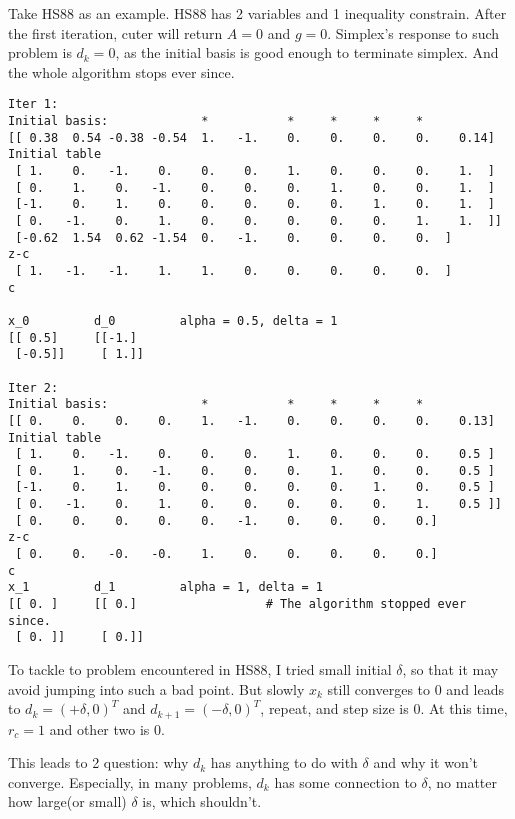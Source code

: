 \documentclass[10pt]{article}
\begin{document}
	Take HS88 as an example. HS88 has 2 variables and 1 inequality constrain. After the first iteration, cuter will return $A = 0$ and $g = 0$. Simplex's response to such problem is $d_k = 0$, as the initial basis is good enough to terminate simplex. And the whole algorithm stops ever since.
	\begin{lstlisting}
Iter 1:
Initial basis:             *           *     *     *     *
[[ 0.38  0.54 -0.38 -0.54  1.   -1.    0.    0.    0.    0.    0.14] 	Initial table
 [ 1.    0.   -1.    0.    0.    0.    1.    0.    0.    0.    1.  ]
 [ 0.    1.    0.   -1.    0.    0.    0.    1.    0.    0.    1.  ]
 [-1.    0.    1.    0.    0.    0.    0.    0.    1.    0.    1.  ]
 [ 0.   -1.    0.    1.    0.    0.    0.    0.    0.    1.    1.  ]]
 [-0.62  1.54  0.62 -1.54  0.   -1.    0.    0.    0.    0.  ]			z-c
 [ 1.   -1.   -1.    1.    1.    0.    0.    0.    0.    0.  ]			c

x_0 		d_0 		alpha = 0.5, delta = 1
[[ 0.5]		[[-1.]
 [-0.5]] 	 [ 1.]]

Iter 2:
Initial basis:             *           *     *     *     *
[[ 0.    0.    0.    0.    1.   -1.    0.    0.    0.    0.    0.13] 	Initial table
 [ 1.    0.   -1.    0.    0.    0.    1.    0.    0.    0.    0.5 ]
 [ 0.    1.    0.   -1.    0.    0.    0.    1.    0.    0.    0.5 ]
 [-1.    0.    1.    0.    0.    0.    0.    0.    1.    0.    0.5 ]
 [ 0.   -1.    0.    1.    0.    0.    0.    0.    0.    1.    0.5 ]]
 [ 0.    0.    0.    0.    0.   -1.    0.    0.    0.    0.]			z-c
 [ 0.    0.   -0.   -0.    1.    0.    0.    0.    0.    0.]			c
x_1 		d_1 		alpha = 1, delta = 1
[[ 0. ]		[[ 0.] 					# The algorithm stopped ever since.
 [ 0. ]] 	 [ 0.]]

	\end{lstlisting}

	To tackle to problem encountered in HS88, I tried small initial $\delta$, so that it may avoid jumping into such a bad point. But slowly $x_k$ still converges to 0 and leads to $d_k = (+\delta, 0)^T$ and $d_{k+1} = (-\delta, 0)^T$, repeat, and step size is 0. At this time, $r_c = 1$ and other two is 0. 
	\par This leads to 2 question: why $d_k$ has anything to do with $\delta$ and why it won't converge. Especially, in many problems, $d_k$ has some connection to $\delta$, no matter how large(or small) $\delta$ is, which shouldn't.
\end{document}
